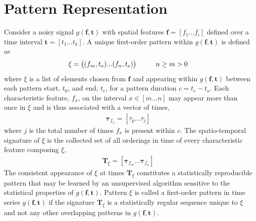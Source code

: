 \documentclass{article}
\newcommand\tab[1][1cm]{\hspace*{#1}}
\renewcommand{\vec}[1]{\mathbf{#1}}
\begin{document}
\section*{Pattern Representation}
Consider a noisy signal $g(\vec{f}, \vec{t})$ with spatial features $\vec{f}=[f_1 ... f_i]$ defined over a time interval $\vec{t}=[t_1 ... t_k]$. A unique first-order pattern within $g(\vec{f}, \vec{t})$ is defined as 
\begin{align}
\xi = \big( (f_{m},t_{o}) ... (f_{n},t_e) \big) \tab n \geq m > 0
\label{eq:pattern}
\end{align}
where $\xi$ is a list of elements chosen from $\vec{f}$ and appearing within $g(\vec{f},\vec{t})$ between each pattern start, $t_0$, and end, $t_e$, for a pattern duration $c=t_e-t_o$. Each characteristic feature, $f_x$, on the interval $x \in [m ... n]$ may appear more than once in $\xi$ and is thus associated with a vector of times, 
\begin{align}
\boldsymbol{\tau}_{f_x}=[\tau_p ... \tau_j]
\end{align}
where $j$ is the total number of times $f_x$ is present within $c$. The spatio-temporal signature of $\xi$ is the collected set of all orderings in time of every characteristic feature composing $\xi$,
\begin{align}
\boldsymbol{T}_\xi=[\boldsymbol{\tau}_{f_{m}} ... \boldsymbol{\tau}_{f_{n}}]
\end{align}
The consistent appearance of $\xi$ at times $\boldsymbol{T}_\xi$ constitutes a statistically reproducible pattern that may be learned by an unsupervised algorithm sensitive to the statistical properties of $g(\vec{f},\vec{t})$. Pattern $\xi$ is called a first-order pattern in time series $g(\vec{f},\vec{t})$ if the signature $\vec{T}_\xi$ is a statistically regular sequence unique to $\xi$ and not any other overlapping patterns in $g(\vec{f},\vec{t})$.
\end{document}
